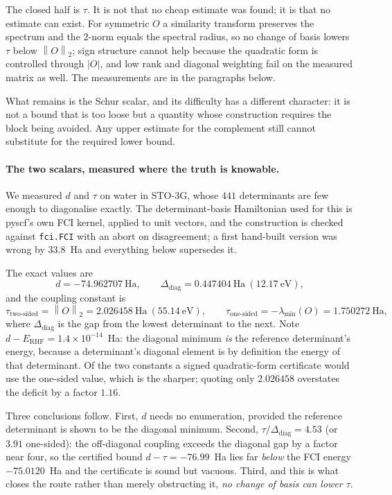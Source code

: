 \documentclass[11pt,a4paper]{article}
\theoremstyle{plain}
\theoremstyle{definition}
\theoremstyle{remark}
\newcommand{\norm}[1]{\left\lVert #1\right\rVert}
\newcommand{\abs}[1]{\left\lvert #1\right\rvert}
\begin{document}
The closed half is $\tau$. It is not that no cheap estimate was found; it is that no
estimate can exist. For symmetric $O$ a similarity transform preserves the spectrum
and the $2$-norm equals the spectral radius, so no change of basis lowers $\tau$
below $\norm{O}_2$; sign structure cannot help because the quadratic form is
controlled through $\abs{O}$, and low rank and diagonal weighting fail on the
measured matrix as well. The measurements are in the paragraphs below.

What remains is the Schur scalar, and its difficulty has a different character: it
is not a bound that is too loose but a quantity whose construction requires the
block being avoided. Any upper estimate for the complement still cannot substitute
for the required lower bound.

\paragraph{The two scalars, measured where the truth is knowable.}
We measured $d$ and $\tau$ on water in STO-3G, whose $441$ determinants are few
enough to diagonalise exactly. The determinant-basis Hamiltonian used for this is
pyscf's own FCI kernel, applied to unit vectors, and the construction is checked
against \texttt{fci.FCI} with an abort on disagreement; a first hand-built version
was wrong by $33.8$~Ha and everything below supersedes it.

The exact values are
\[
d = -74.962707\ \text{Ha},\qquad
\Delta_{\mathrm{diag}} = 0.447404\ \text{Ha}\ (12.17\ \text{eV}),
\]
and the coupling constant is
\[
\tau_{\text{two-sided}} = \norm{O}_2 = 2.026458\ \text{Ha}\ (55.14\ \text{eV}),
\qquad
\tau_{\text{one-sided}} = -\lambda_{\min}(O) = 1.750272\ \text{Ha},
\]
where $\Delta_{\mathrm{diag}}$ is the gap from the lowest determinant to the next.
Note $d - E_{\mathrm{RHF}} = 1.4\times10^{-14}$~Ha: the diagonal minimum \emph{is}
the reference determinant's energy, because a determinant's diagonal element is by
definition the energy of that determinant. Of the two constants a signed
quadratic-form certificate would use the one-sided value, which is the sharper;
quoting only $2.026458$ overstates the deficit by a factor $1.16$.

Three conclusions follow. First, $d$ needs no enumeration, provided the reference
determinant is shown to be the diagonal minimum. Second,
$\tau/\Delta_{\mathrm{diag}} = 4.53$ (or $3.91$ one-sided): the off-diagonal
coupling exceeds the diagonal gap by a factor near four, so the certified bound
$d-\tau = -76.99$~Ha lies far \emph{below} the FCI energy $-75.0120$~Ha and the
certificate is sound but vacuous. Third, and this is what closes the route rather
than merely obstructing it, \emph{no change of basis can lower $\tau$}.
\end{document}
